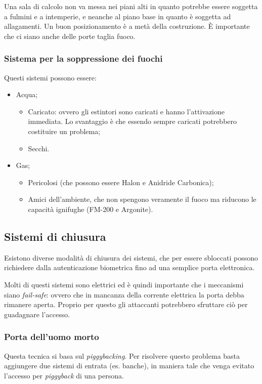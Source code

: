 Una sala di calcolo non va messa nei piani alti in quanto potrebbe essere
soggetta a fulmini e a intemperie, e neanche al piano base in quanto è soggetta
ad allagamenti. Un buon posizionamento è a metà della costruzione. È
importante che ci siano anche delle porte taglia fuoco.

\subsubsection{Sistema per la soppressione dei fuochi}

Questi sistemi possono essere:
\begin{itemize}
\item Acqua;
\begin{itemize}
\item Caricato: ovvero gli estintori sono caricati e hanno l'attivazione
immediata. Lo svantaggio è che essendo sempre caricati potrebbero costituire un
problema;
\item Secchi.
\end{itemize}
\item Gas;
\begin{itemize}
\item Pericolosi (che possono essere Halon e Anidride Carbonica);
\item Amici dell'ambiente, che non spengono veramente il fuoco ma riducono le
capacità ignifughe (FM-200 e Argonite).
\end{itemize}
\end{itemize}

\subsection{Sistemi di chiusura}

Esistono diverse modalità di chiusura dei sistemi, che per essere sbloccati
possono richiedere dalla autenticazione biometrica fino ad una semplice
porta elettronica.

Molti di questi sistemi sono elettrici ed è quindi importante che i
meccanismi siano \textit{fail-safe}: ovvero che in mancanza della corrente
elettrica la porta debba rimanere aperta. Proprio per questo gli attaccanti
potrebbero sfruttare ciò per guadagnare l'accesso.

\subsubsection{Porta dell'uomo morto}

Questa tecnica si basa sul \textit{piggybacking}. Per risolvere questo problema
basta aggiungere due sistemi di entrata (es. banche), in maniera tale che venga evitato
l'accesso per \textit{piggyback} di una persona.


